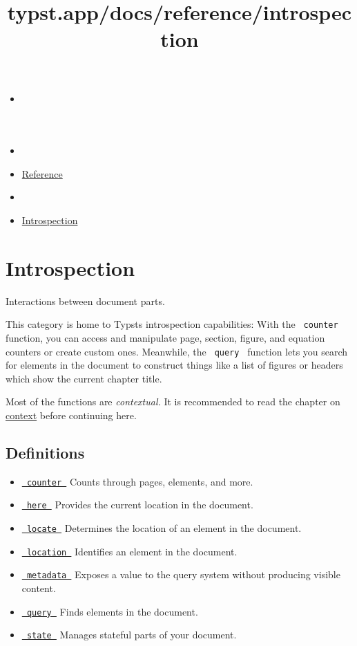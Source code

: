 \title{typst.app/docs/reference/introspection}

\begin{itemize}
\tightlist
\item
  \href{/docs}{}
\item
  
\item
  \href{/docs/reference/}{Reference}
\item
  
\item
  \href{/docs/reference/introspection/}{Introspection}
\end{itemize}

\section{Introspection}\label{summary}

Interactions between document parts.

This category is home to Typst\textquotesingle s introspection
capabilities: With the \texttt{\ counter\ } function, you can access and
manipulate page, section, figure, and equation counters or create custom
ones. Meanwhile, the \texttt{\ query\ } function lets you search for
elements in the document to construct things like a list of figures or
headers which show the current chapter title.

Most of the functions are \emph{contextual.} It is recommended to read
the chapter on \href{/docs/reference/context/}{context} before
continuing here.

\subsection{Definitions}\label{definitions}

\begin{itemize}
\tightlist
\item
  \href{/docs/reference/introspection/counter/}{\texttt{\ counter\ }} {
  Counts through pages, elements, and more. }
\item
  \href{/docs/reference/introspection/here/}{\texttt{\ here\ }} {
  Provides the current location in the document. }
\item
  \href{/docs/reference/introspection/locate/}{\texttt{\ locate\ }} {
  Determines the location of an element in the document. }
\item
  \href{/docs/reference/introspection/location/}{\texttt{\ location\ }}
  { Identifies an element in the document. }
\item
  \href{/docs/reference/introspection/metadata/}{\texttt{\ metadata\ }}
  { Exposes a value to the query system without producing visible
  content. }
\item
  \href{/docs/reference/introspection/query/}{\texttt{\ query\ }} {
  Finds elements in the document. }
\item
  \href{/docs/reference/introspection/state/}{\texttt{\ state\ }} {
  Manages stateful parts of your document. }
\end{itemize}

